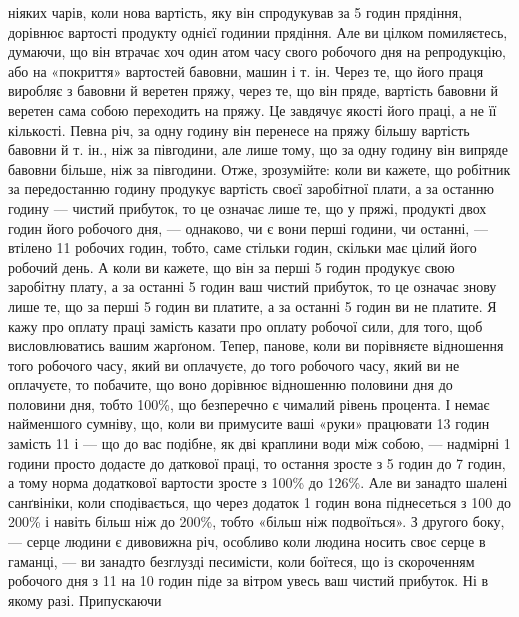 \parcont{}  %
ніяких чарів, коли нова вартість, яку він спродукував за 5 годин прядіння, дорівнює вартості
продукту однієї годинии прядіння. Але ви цілком помиляєтесь, думаючи, що він втрачає хоч один атом
часу свого робочого дня на репродукцію, або на «покриття» вартостей бавовни, машин і т. ін. Через
те, що його праця виробляє з бавовни й веретен пряжу, через те, що він пряде, вартість бавовни й
веретен сама собою переходить на пряжу.
Це завдячує якості його праці, а не її кількості. Певна річ, за одну годину він перенесе на пряжу
більшу вартість бавовни й т. ін., ніж за півгодини, але лише тому, що за одну годину він випряде
бавовни більше, ніж за півгодини. Отже, зрозумійте: коли ви кажете, що робітник за передостанню
годину продукує вартість своєї заробітної плати, а за останню годину — чистий прибуток, то це
означає лише те, що у пряжі, продукті двох годин його робочого дня, — однаково, чи є вони перші
години, чи останні, — втілено 11 робочих годин, тобто, саме стільки годин, скільки має цілий
його робочий день. А коли ви кажете, що він за перші 5 годин продукує свою заробітну плату, а за
останні 5 годин ваш чистий прибуток, то це означає знову лише те, що за перші 5 годин ви
платите, а за останні 5 годин
ви не платите. Я кажу про оплату праці замість казати про оплату робочої сили, для того, щоб
висловлюватись вашим жарґоном. Тепер, панове, коли ви порівняєте відношення того робочого
часу, який ви оплачуєте, до того робочого часу, який ви не оплачуєте, то побачите, що воно дорівнює
відношенню половини дня до половини дня, тобто 100\%, що безперечно є чималий рівень процента. І
немає найменшого сумніву, що, коли ви примусите ваші «руки» працювати 13 годин замість 11 і — що
до вас подібне, як дві краплини води між собою, — надмірні 1 години просто додасте до даткової
праці, то остання зросте з 5 годин до 7 годин, а тому норма додаткової вартости зросте з
100\% до 126\%. Але ви занадто шалені санґвініки, коли сподівається, що через додаток 1 годин
вона піднесеться з 100 до 200\% і навіть більш ніж до 200\%, тобто «більш ніж подвоїться». З другого
боку, — серце людини є дивовижна річ, особливо коли людина носить своє серце в гаманці, — ви занадто
безглузді песимісти, коли боїтеся, що із скороченням робочого
дня з 11 на 10 годин піде за вітром увесь ваш чистий прибуток. Ні в якому разі. Припускаючи
